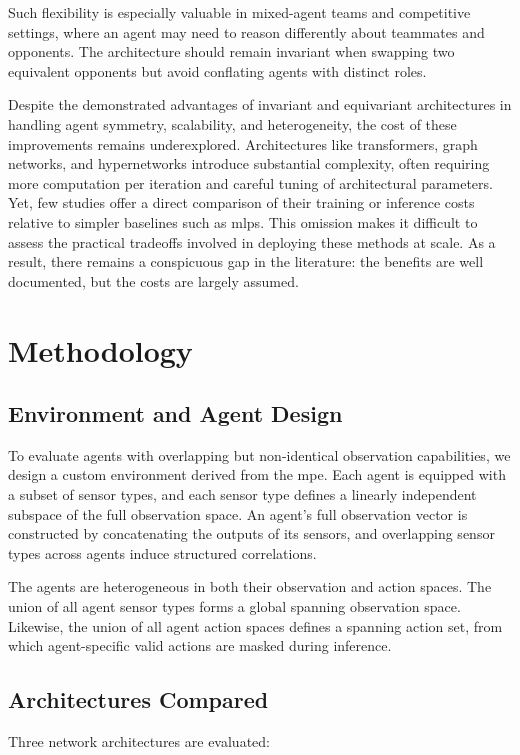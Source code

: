 Such flexibility is especially valuable in mixed-agent teams and 
competitive settings, where an agent may need to reason differently 
about teammates and opponents. The architecture should remain invariant 
when swapping two equivalent opponents but avoid conflating agents 
with distinct roles.

Despite the demonstrated advantages of invariant and equivariant architectures 
in handling agent symmetry, scalability, and heterogeneity, 
the cost of these improvements remains underexplored. 
Architectures like transformers, graph networks, and hypernetworks 
introduce substantial complexity, often requiring more computation 
per iteration and careful tuning of architectural parameters. 
Yet, few studies offer a direct comparison of their training or 
inference costs relative to simpler baselines such as \glspl{mlp}. 
This omission makes it difficult to assess the practical tradeoffs 
involved in deploying these methods at scale. As a result, 
there remains a conspicuous gap in the literature: 
the benefits are well documented, but the costs are largely assumed.

\section{Methodology}
\label{con2:sec:methodology}

\subsection{Environment and Agent Design}

To evaluate agents with overlapping but non-identical observation capabilities, 
we design a custom environment derived from the \gls{mpe}. 
Each agent is equipped with a subset of sensor types, 
and each sensor type defines a linearly independent subspace of the 
full observation space. An agent's full observation vector is constructed by 
concatenating the outputs of its sensors, and overlapping sensor types across 
agents induce structured correlations.

The agents are heterogeneous in both their observation and action spaces. 
The union of all agent sensor types forms a global spanning observation space. 
Likewise, the union of all agent action spaces defines a spanning action set, 
from which agent-specific valid actions are masked during inference.

\subsection{Architectures Compared}
Three network architectures are evaluated:

